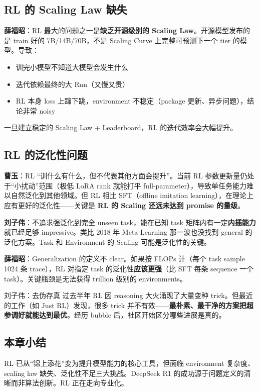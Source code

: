 \documentclass[a4paper]{article}
\begin{document}
\subsection{RL 的 Scaling Law 缺失}

\textbf{薛福昭}：RL 最大的问题之一是\textbf{缺乏开源级别的 Scaling Law}。开源模型发布的是 train 好的 7B/14B/70B，不是 Scaling Curve 上完整可预测下一个 tier 的模型。导致：
\begin{itemize}
  \item 训完小模型不知道大模型会发生什么
  \item 迭代依赖最终的大 Run（又慢又贵）
  \item RL 本身 loss 上蹿下跳，environment 不稳定（package 更新、异步问题），结论非常 noisy
\end{itemize}
一旦建立稳定的 Scaling Law + Leaderboard，RL 的迭代效率会大幅提升。

\subsection{RL 的泛化性问题}

\textbf{曹玉}：RL ``训什么有什么，但不代表其他方面会提升''。当前 RL 参数更新量仍处于``小扰动''范围（极低 LoRA rank 就能打平 full-parameter），导致单任务能力难以自然泛化到其他领域。但 RL 相比 SFT（offline imitation learning），在理论上应有更好的泛化性——关键是 \textbf{RL 的 Scaling 还远未达到 promise 的量级}。

\textbf{刘子伟}：不追求强泛化到完全 unseen task，能在已知 task 矩阵内有一定\textbf{内插能力}就已经足够 impressive。类比 2018 年 Meta Learning 那一波也没找到 general 的泛化方案。Task 和 Environment 的 Scaling 可能是泛化性的关键。

\textbf{薛福昭}：Generalization 的定义不 clear。如果按 FLOPs 计（每个 task sample 1024 条 trace），RL 对指定 task 的泛化性\textbf{应该更强}（比 SFT 每条 sequence 一个 task）。关键瓶颈是无法获得 trillion 级别的 environments。

\begin{knowledgebox}{刘子伟：去伪存真}
过去半年 RL 因 reasoning 大火涌现了大量变种 trick。但最近的工作（如 Just RL）发现，很多 trick 并不有效——\textbf{最朴素、最干净的方案把超参调好就能达到最优}。经历 bubble 后，社区开始区分哪些进展是真的。
\end{knowledgebox}

\subsection{本章小结}
RL 已从``锦上添花''变为提升模型能力的核心工具，但面临 environment 复杂度、scaling law 缺失、泛化性不足三大挑战。DeepSeek R1 的成功源于问题定义的清晰而非算法创新。RL 正在走向专业化。
\end{document}
